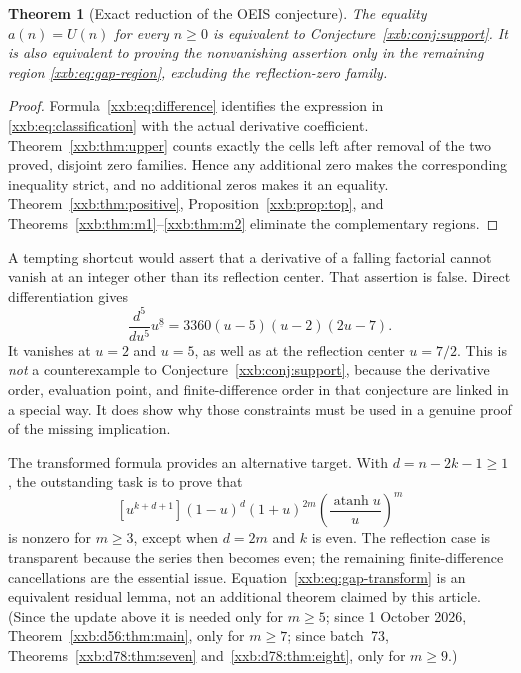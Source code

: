 \documentclass[11pt,a4paper]{article}
\numberwithin{equation}{section}
\newtheorem{theorem}{Theorem}[section]
\theoremstyle{definition}
\theoremstyle{remark}
\theoremstyle{plain}
\DeclareMathOperator{\atanh}{atanh}
\newcommand{\U}{U}
\newcommand{\fall}[2]{#1^{\underline{#2}}}
\begin{document}
\begin{theorem}[Exact reduction of the OEIS conjecture]\label{xxb:thm:equivalence}
The equality $a(n)=\U(n)$ for every $n\ge0$ is equivalent to
Conjecture~\ref{xxb:conj:support}. It is also equivalent to proving the
nonvanishing assertion only in the remaining region
\eqref{xxb:eq:gap-region}, excluding the reflection-zero family.
\end{theorem}
\begin{proof}
Formula~\eqref{xxb:eq:difference} identifies the expression in
\eqref{xxb:eq:classification} with the actual derivative coefficient.
Theorem~\ref{xxb:thm:upper} counts exactly the cells left after removal of the
two proved, disjoint zero families. Hence any additional zero makes the
corresponding inequality strict, and no additional zeros makes it an
equality. Theorem~\ref{xxb:thm:positive}, Proposition~\ref{xxb:prop:top}, and
Theorems~\ref{xxb:thm:m1}--\ref{xxb:thm:m2} eliminate the complementary regions.
\end{proof}

A tempting shortcut would assert that a derivative of a falling factorial
cannot vanish at an integer other than its reflection center. That
assertion is false. Direct differentiation gives
\begin{equation}\label{xxb:eq:false-shortcut}
 \frac{d^5}{du^5}\fall{u}{8}
 =3360(u-5)(u-2)(2u-7).
\end{equation}
It vanishes at $u=2$ and $u=5$, as well as at the reflection center
$u=7/2$. This is \emph{not} a counterexample to
Conjecture~\ref{xxb:conj:support}, because the derivative order, evaluation
point, and finite-difference order in that conjecture are linked in a
special way. It does show why those constraints must be used in a genuine
proof of the missing implication.

The transformed formula provides an alternative target. With
$d=n-2k-1\ge1$, the outstanding task is to prove that
\begin{equation}\label{xxb:eq:gap-transform}
 [u^{k+d+1}](1-u)^d(1+u)^{2m}
       \left(\frac{\atanh u}{u}\right)^m
\end{equation}
is nonzero for $m\ge3$, except when $d=2m$ and $k$ is even. The
reflection case is transparent because the series then becomes even;
the remaining finite-difference cancellations are the essential issue.
Equation~\eqref{xxb:eq:gap-transform} is an equivalent residual lemma, not an
additional theorem claimed by this article.  (Since the update above it is
needed only for $m\ge5$; since 1 October 2026, Theorem~\ref{xxb:d56:thm:main},
only for $m\ge7$; since batch~73, Theorems~\ref{xxb:d78:thm:seven}
and~\ref{xxb:d78:thm:eight}, only for $m\ge9$.)
\end{document}
